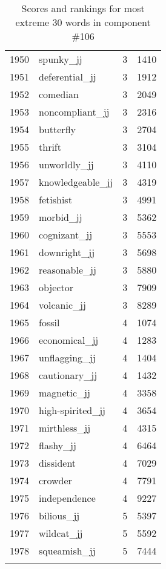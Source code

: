\begin{longtable}[!htbp]{| rlr@{.}l |}
    1950 & spunky\_jj & 3 & 1410 \\
    1951 & deferential\_jj & 3 & 1912 \\
    1952 & comedian & 3 & 2049 \\
    1953 & noncompliant\_jj & 3 & 2316 \\
    1954 & butterfly & 3 & 2704 \\
    1955 & thrift & 3 & 3104 \\
    1956 & unworldly\_jj & 3 & 4110 \\
    1957 & knowledgeable\_jj & 3 & 4319 \\
    1958 & fetishist & 3 & 4991 \\
    1959 & morbid\_jj & 3 & 5362 \\
    1960 & cognizant\_jj & 3 & 5553 \\
    1961 & downright\_jj & 3 & 5698 \\
    1962 & reasonable\_jj & 3 & 5880 \\
    1963 & objector & 3 & 7909 \\
    1964 & volcanic\_jj & 3 & 8289 \\
    1965 & fossil & 4 & 1074 \\
    1966 & economical\_jj & 4 & 1283 \\
    1967 & unflagging\_jj & 4 & 1404 \\
    1968 & cautionary\_jj & 4 & 1432 \\
    1969 & magnetic\_jj & 4 & 3358 \\
    1970 & high-spirited\_jj & 4 & 3654 \\
    1971 & mirthless\_jj & 4 & 4315 \\
    1972 & flashy\_jj & 4 & 6464 \\
    1973 & dissident & 4 & 7029 \\
    1974 & crowder & 4 & 7791 \\
    1975 & independence & 4 & 9227 \\
    1976 & bilious\_jj & 5 & 5397 \\
    1977 & wildcat\_jj & 5 & 5592 \\
    1978 & squeamish\_jj & 5 & 7444 \\
    \hline
    \caption{Scores and rankings for most extreme 30 words in component \#106} \\
\end{longtable}
